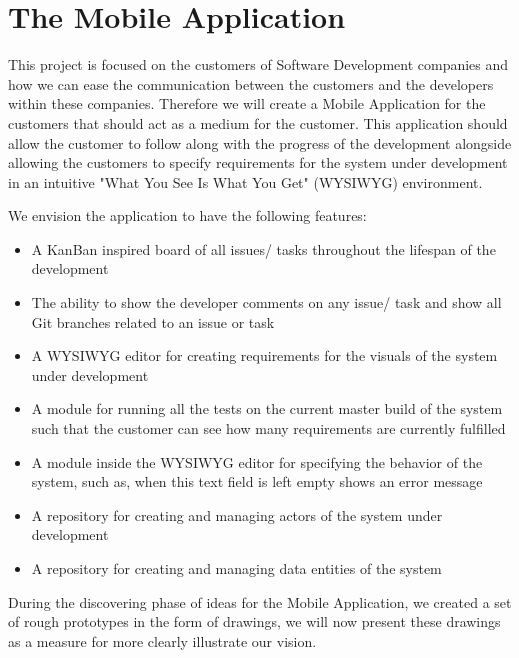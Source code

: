 \section{The Mobile Application}
This project is focused on the customers of Software Development companies and how we can ease the communication between the customers and the developers within these companies.
Therefore we will create a Mobile Application for the customers that should act as a medium for the customer. 
This application should allow the customer to follow along with the progress of the development alongside allowing the customers to specify requirements for the system under development in an intuitive "What You See Is What You Get" (WYSIWYG) environment.

We envision the application to have the following features:

\begin{itemize}
    \item A KanBan inspired board of all issues/ tasks throughout the lifespan of the development
    \item The ability to show the developer comments on any issue/ task and show all Git branches related to an issue or task
    \item A WYSIWYG editor for creating requirements for the visuals of the system under development
    \item A module for running all the tests on the current master build of the system such that the customer can see how many requirements are currently fulfilled
    \item A module inside the WYSIWYG editor for specifying the behavior of the system, such as, when this text field is left empty shows an error message
    \item A repository for creating and managing actors of the system under development
    \item A repository for creating and managing data entities of the system
\end{itemize}

During the discovering phase of ideas for the Mobile Application, we created a set of rough prototypes in the form of drawings, we will now present these drawings as a measure for more clearly illustrate our vision.

